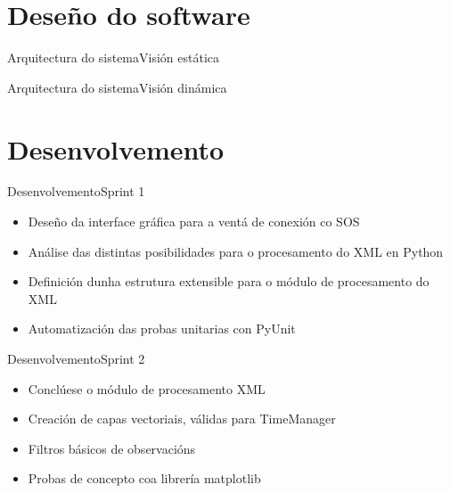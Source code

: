 \documentclass{beamer}
\begin{document}
\section{Deseño do software}
\begin{frame}{Arquitectura do sistema}{Visión estática}
\begin{block}{}
\begin{overprint}
\end{overprint}
\end{block}
\end{frame}

\begin{frame}{Arquitectura do sistema}{Visión dinámica}
\begin{block}
\centering

\end{block}
\end{frame}

\section{Desenvolvemento}
\begin{frame}[t]{Desenvolvemento}{Sprint 1}
\begin{block}{}
\begin{itemize}\bigskip\bigskip\bigskip
\item Deseño da interface gráfica para a ventá de conexión co SOS\smallskip
\item Análise das distintas posibilidades para o procesamento do XML en Python\smallskip
\item Definición dunha estrutura extensible para o módulo de procesamento do XML\smallskip
\item Automatización das probas unitarias con PyUnit\bigskip\bigskip\bigskip
\end{itemize}
\end{block}
\end{frame}

\begin{frame}[t]{Desenvolvemento}{Sprint 2}
\begin{block}{}
\begin{itemize}\bigskip\bigskip\bigskip
\item Conclúese o módulo de procesamento XML\smallskip
\item Creación de capas vectoriais, válidas para TimeManager\smallskip
\item Filtros básicos de observacións\smallskip
\item Probas de concepto coa librería matplotlib\bigskip\bigskip\bigskip
\end{itemize}
\end{block}
\end{frame}
\end{document}

